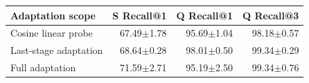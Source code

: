 \begin{tabular}{lrrr}
\toprule
Adaptation scope & S Recall@1 & Q Recall@1 & Q Recall@3 \\
\midrule
Cosine linear probe & 67.49$\pm$1.78 & 95.69$\pm$1.04 & 98.18$\pm$0.57 \\
Last-stage adaptation & 68.64$\pm$0.28 & 98.01$\pm$0.50 & 99.34$\pm$0.29 \\
Full adaptation & 71.59$\pm$2.71 & 95.19$\pm$2.50 & 99.34$\pm$0.76 \\
\bottomrule
\end{tabular}
